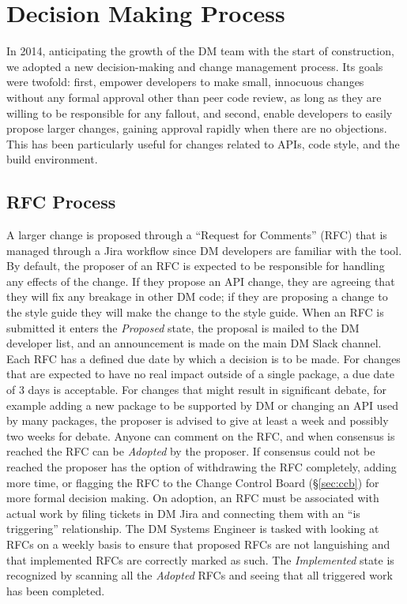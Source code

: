 \section{Decision Making Process}
In 2014, anticipating the growth of the DM team with the start of construction, we adopted a new decision-making and change management process.
Its goals were twofold: first, empower developers to make small, innocuous changes without any formal approval other than peer code review, as long as they are willing to be responsible for any fallout, and second, enable developers to easily propose larger changes, gaining approval rapidly when there are no objections.
This has been particularly useful for changes related to APIs, code style, and the build environment.

\subsection{RFC Process}
\label{sec:rfc}
A larger change is proposed through a ``Request for Comments'' (RFC) that is managed through a Jira workflow since DM developers are familiar with the tool.
By default, the proposer of an RFC is expected to be responsible for handling any effects of the change.
If they propose an API change, they are agreeing that they will fix any breakage in other DM code; if they are proposing a change to the style guide they will make the change to the style guide.
When an RFC is submitted it enters the \emph{Proposed} state, the proposal is mailed to the DM developer list, and an announcement is made on the main DM Slack channel.
Each RFC has a defined due date by which a decision is to be made.
For changes that are expected to have no real impact outside of a single package, a due date of 3 days is acceptable.
For changes that might result in significant debate, for example adding a new package to be supported by DM or changing an API used by many packages, the proposer is advised to give at least a week and possibly two weeks for debate.
Anyone can comment on the RFC, and when consensus is reached the RFC can be \emph{Adopted} by the proposer.
If consensus could not be reached the proposer has the option of withdrawing the RFC completely, adding more time, or flagging the RFC to the Change Control Board (\S\ref{sec:ccb}) for more formal decision making.
On adoption, an RFC must be associated with actual work by filing tickets in DM Jira and connecting them with an ``is triggering'' relationship.
The DM Systems Engineer is tasked with looking at RFCs on a weekly basis to ensure that proposed RFCs are not languishing and that implemented RFCs are correctly marked as such.
The \emph{Implemented} state is recognized by scanning all the \emph{Adopted} RFCs and seeing that all triggered work has been completed.

